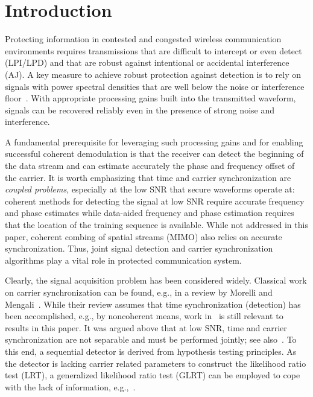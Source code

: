 \section{Introduction}%
\label{sec:introduction}


Protecting information in contested and congested wireless
communication environments requires transmissions that are difficult
to intercept or even detect (LPI/LPD) and that are robust against
intentional or accidental interference (AJ).
A key measure to achieve robust protection against detection is to rely on
signals with power spectral densities that are well below the noise or
interference floor~\cite{Yan_19}.
With appropriate processing gains built into the transmitted waveform, signals can be
recovered reliably even in the presence of strong noise and
interference.

A fundamental prerequisite for leveraging such processing gains and
for enabling successful coherent demodulation is that the receiver can
detect the beginning of the data stream and
can estimate accurately the phase and frequency offset of the carrier.
It is worth emphasizing that time and carrier synchronization are
\emph{coupled problems}, especially at the low SNR that secure
waveforms operate at:
coherent methods for detecting the signal at low SNR require accurate frequency and phase estimates 
while data-aided frequency and phase estimation requires that the
location of the training sequence is available.
While not addressed in this paper, coherent combing of
spatial streams (MIMO) also relies on accurate synchronization.
Thus, joint signal detection and carrier synchronization algorithms
play a vital role in protected communication system.

Clearly, the signal acquisition problem has been considered widely. 
Classical work on carrier synchronization can be found, e.g., in a
review by  Morelli
and Mengali~\cite{Morelli_Mengali_98}. 
While their review assumes that time synchronization (detection) has been
accomplished, e.g., by noncoherent means, 
work in~\cite{kay_89,Fitz_94,Luise_Reggiannini_95}
is still relevant to results in this paper.
It was argued above that at low SNR, time and carrier synchronization
are not separable and must be performed jointly; see also~\cite{purushothaman_16,kim_17}.
To this end, 
a sequential detector is derived from hypothesis testing principles.
As the detector is lacking carrier related parameters to construct 
the likelihood ratio test (LRT), a generalized likelihood ratio test (GLRT)
can be employed to cope with the lack of information, e.g.,~\cite{liang_15}.

